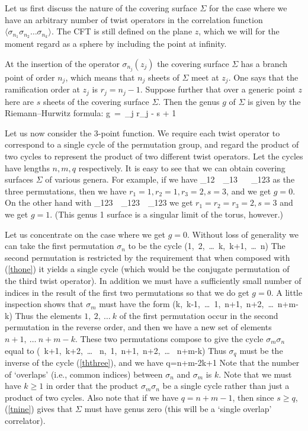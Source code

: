 \documentclass[12pt]{article}
\begin{document}
Let us first discuss the nature of the covering surface $\Sigma$ for
the case where we have an arbitrary number of twist
operators in the correlation function $\langle\sigma_{n_1}\sigma_{n_2}\dots
\sigma_{n_k}\rangle $.  The CFT is still defined on the
plane $z$, which we will for the moment regard as a sphere by
including the point at infinity.

At the insertion of the operator $\sigma_{n_j}(z_j)$ the covering
surface $\Sigma$ has a branch point of order $n_j$, which
means that $n_j$ sheets of $\Sigma$ meet at $z_j$. One says that the
ramification order at $z_j$ is $r_j=n_j-1$. Suppose
further that over a generic point $z$ here are $s$ sheets of the
covering surface $\Sigma$. Then the genus $g$ of $\Sigma$
is given by the Riemann--Hurwitz formula:
\be
g~=~\sum_j r_j - s + 1
\label{tnine}
\ee

Let us now consider the 3-point function.  We require each twist operator to
correspond to a single cycle of the permutation group,
and regard the product of two cycles to represent the
product of two different twist operators.  Let the cycles
have lengths $n,m,q$ respectively.  It is easy to see that we can
obtain covering surfaces $\Sigma$ of various genera.
For example, if we have
\be
\sigma_{12}~~\sigma_{13} ~ ~\sigma_{123}
\ee
as the three permutations, then we have $r_1=1, r_2=1, r_3=2, s=3$,
and we get $g=0$. On the other hand with
\be
\sigma_{123}~~\sigma_{123}~~\sigma_{123}
\ee
we get $r_1=r_2=r_3=2, s=3$ and we get $g=1$.  (This genus 1 surface
is a singular limit of the torus, however.)

Let us concentrate on the case where we get $g=0$.
Without loss of generality we can take the first permutation
$\sigma_n$ to be the cycle
\be
(1,~2,~\dots ~k,~k+1,~\dots ~n)
\label{thone}
\ee
The second permutation is restricted by the requirement that when
composed with (\ref{thone}) it yields a single cycle
(which would be the conjugate permutation of the third twist
operator).  In addition we must have a sufficiently small
number of indices in the result of the first two permutations so that
we do get $g=0$. A little inspection shows that
$\sigma_m$ must have the form
\be
(k,~k-1,~\dots~1,~n+1,~n+2,~\dots~n+m-k)
\label{thtwo}
\ee
Thus the elements $1,~2,~\dots~k$ of the first permutation occur in the
second permutation in the reverse order, and
then we have a new set of elements $n+1,~\dots ~n+m-k$. These two
permutations compose
to give the cycle
$\sigma_m\sigma_n$ equal to
\be
(~k+1,~k+2,~\dots~ n,~1,~n+1,~n+2,~\dots ~ n+m-k)
\label{ththree}
\ee
Thus $\sigma_q$ must be the inverse of the cycle (\ref{ththree}), and we have
\be
q=n+m-2k+1
\label{thfour}
\ee
Note that the number of `overlaps' (i.e., common indices) between
$\sigma_n$ and $\sigma_m$ is $k$. Note that we must
have
$k\ge 1$ in order that the product $\sigma_m\sigma_n$ be a single
cycle rather than just a product of two cycles. Also note that if we 
have $q=n+m-1$,  then
since $s\ge q$, (\ref{tnine}) gives that $\Sigma$ must have genus 
zero (this will be a `single overlap'
correlator).
\end{document}

